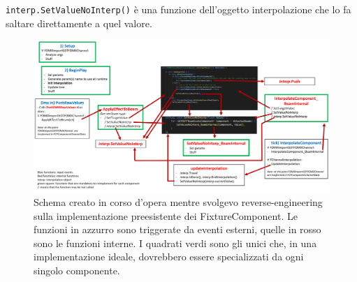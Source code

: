 \documentclass[main.tex]{subfiles}
\begin{document}
\lstinline{interp.SetValueNoInterp()} è una funzione dell'oggetto interpolazione che lo fa saltare direttamente a quel valore.

\begin{figure}[H]
    \centering
    \includegraphics[width=1\linewidth]{img/fixtureComponent/CallOrderScheme.png}
    \caption{Schema creato in corso d'opera mentre svolgevo reverse-engineering sulla implementazione preesistente dei FixtureComponent. Le funzioni in azzurro sono triggerate da eventi esterni, quelle in rosso sono le funzioni interne. I quadrati verdi sono gli unici che, in una implementazione ideale, dovrebbero essere specializzati da ogni singolo componente.}
    \label{fig:3_CallOrderOld}
\end{figure}
\end{document}
